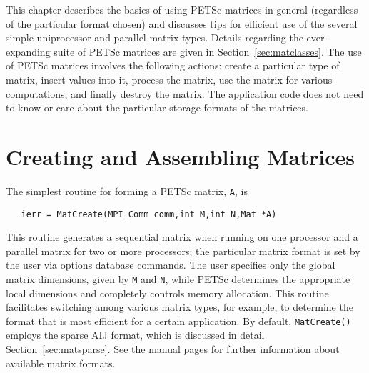 This chapter describes the basics of using PETSc matrices in general
(regardless of the particular format chosen) and discusses tips
for efficient use of the several simple uniprocessor and parallel
matrix types.  Details regarding the ever-expanding suite of
PETSc matrices are given in Section~\ref{sec:matclasses}.
The use of PETSc matrices involves the following actions: create a
particular type of matrix, insert values into it, process the matrix,
use the matrix for various computations, and finally destroy the
matrix.  The application code does not need to know or care about the
particular storage formats of the matrices.

\section{Creating and Assembling Matrices}
\label{sec:matcreate}

The simplest routine for forming a PETSc matrix, {\tt A}, is 
\begin{verbatim}
   ierr = MatCreate(MPI_Comm comm,int M,int N,Mat *A)
\end{verbatim}
This routine generates a sequential matrix when running on one
processor and a parallel matrix for two or more processors; the
particular matrix format is set by the user via options database
commands.  The user specifies only the global matrix dimensions, given
by {\tt M} and {\tt N}, while PETSc determines the appropriate local
dimensions and completely controls memory allocation.  This routine
facilitates switching among various matrix types, for example, to
determine the format that is most efficient for a certain
application.  By default, {\tt MatCreate()} employs the sparse AIJ
format, which is discussed in detail Section~\ref{sec:matsparse}.  See
the manual pages for further information about available matrix formats.

